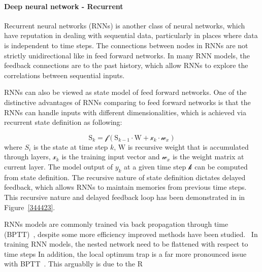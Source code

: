 \paragraph{Deep neural network - Recurrent}
Recurrent neural networks (RNNs) is another class of neural networks, which have reputation in dealing with sequential data, particularly in places where data is independent to time steps. The connections between nodes in RNNs are not strictly unidirectional like in feed forward networks. In many RNN models, the feedback connections are to the past history, which allow RNNs to explore the correlations between sequential inputs.   
\par 
RNNs can also be viewed as state model of feed forward networks. One of the distinctive advantages of RNNs comparing to feed forward networks is that the RNNs can handle inputs with different dimensionalities, which is achieved via recurrent state definition as following:

\begin{equation}
    \mathrm{S}_k = \mathcal{f}(\mathrm{S}_{k-1} \cdot \mathrm{W} + \mathcal{x}_k \cdot \mathcal{w}_x)
\end{equation}
where $S_i$ is the state at time step $k$, $\mathrm{W}$ is recursive weight that is accumulated through layers, $\mathcal{x}_k$ is the training input vector and $\mathcal{w}_x$ is the weight matrix at current layer. The model output of $y_k$ at a given time step $\mathcal{k}$ can be computed from state definition. The recursive nature of state definition dictates delayed feedback, which allows RNNs to maintain memories from previous time steps. This recursive nature and delayed feedback loop has been demonstrated in in Figure~\ref{344423}. 
\par 
RNNs models are commonly trained via back propagation through time (BPTT)~\cite{Goodfellow-et-al-2016}, despite some more efficiency improved methods have been studied.~\cite{963769,neco.1989,Gomez:2008:ANE:1390681.1390712} In training RNN models, the nested network need to be flattened with respect to time steps
In addition, the local optimum trap is a far more pronounced issue with BPTT~\cite{Cu_llar}. This arguablly is due to the R